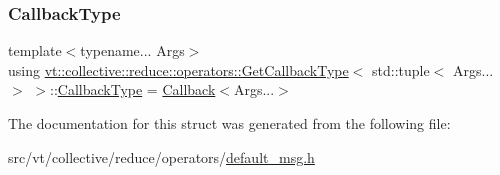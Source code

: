 \subsubsection{\texorpdfstring{Callback\+Type}{CallbackType}}
{\footnotesize\ttfamily template$<$typename... Args$>$ \\
using \hyperlink{structvt_1_1collective_1_1reduce_1_1operators_1_1_get_callback_type}{vt\+::collective\+::reduce\+::operators\+::\+Get\+Callback\+Type}$<$ std\+::tuple$<$ Args... $>$ $>$\+::\hyperlink{structvt_1_1collective_1_1reduce_1_1operators_1_1_get_callback_type_3_01std_1_1tuple_3_01_args_8_8_8_01_4_01_4_abd4a5d512d6e408672bc49e8f082a245}{Callback\+Type} =  \hyperlink{namespacevt_a57b238783d05de96bc2c4027f7073b7f}{Callback}$<$Args...$>$}



The documentation for this struct was generated from the following file\+:\begin{DoxyCompactItemize}
\item 
src/vt/collective/reduce/operators/\hyperlink{default__msg_8h}{default\+\_\+msg.\+h}\end{DoxyCompactItemize}
